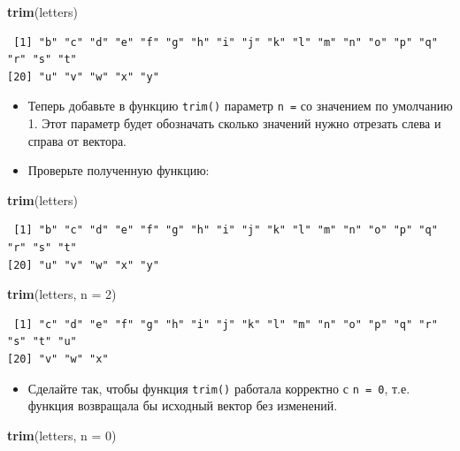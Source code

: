 \documentclass[
]{book}
\newenvironment{Shaded}{\begin{snugshade}}{\end{snugshade}}
\newcommand{\DataTypeTok}[1]{\textcolor[rgb]{0.13,0.29,0.53}{#1}}
\newcommand{\DecValTok}[1]{\textcolor[rgb]{0.00,0.00,0.81}{#1}}
\newcommand{\KeywordTok}[1]{\textcolor[rgb]{0.13,0.29,0.53}{\textbf{#1}}}
\newcommand{\NormalTok}[1]{#1}
\providecommand{\tightlist}{%
  \setlength{\itemsep}{0pt}\setlength{\parskip}{0pt}}
\begin{document}
\begin{Shaded}
\begin{Highlighting}[]
\KeywordTok{trim}\NormalTok{(letters)}
\end{Highlighting}
\end{Shaded}

\begin{verbatim}
 [1] "b" "c" "d" "e" "f" "g" "h" "i" "j" "k" "l" "m" "n" "o" "p" "q" "r" "s" "t"
[20] "u" "v" "w" "x" "y"
\end{verbatim}

\begin{itemize}
\item
  Теперь добавьте в функцию \texttt{trim()} параметр \texttt{n\ =} со значением по умолчанию 1. Этот параметр будет обозначать сколько значений нужно отрезать слева и справа от вектора.
\item
  Проверьте полученную функцию:
\end{itemize}

\begin{Shaded}
\begin{Highlighting}[]
\KeywordTok{trim}\NormalTok{(letters)}
\end{Highlighting}
\end{Shaded}

\begin{verbatim}
 [1] "b" "c" "d" "e" "f" "g" "h" "i" "j" "k" "l" "m" "n" "o" "p" "q" "r" "s" "t"
[20] "u" "v" "w" "x" "y"
\end{verbatim}

\begin{Shaded}
\begin{Highlighting}[]
\KeywordTok{trim}\NormalTok{(letters, }\DataTypeTok{n =} \DecValTok{2}\NormalTok{)}
\end{Highlighting}
\end{Shaded}

\begin{verbatim}
 [1] "c" "d" "e" "f" "g" "h" "i" "j" "k" "l" "m" "n" "o" "p" "q" "r" "s" "t" "u"
[20] "v" "w" "x"
\end{verbatim}

\begin{itemize}
\tightlist
\item
  Сделайте так, чтобы функция \texttt{trim()} работала корректно с \texttt{n\ =\ 0}, т.е. функция возвращала бы исходный вектор без изменений.
\end{itemize}

\begin{Shaded}
\begin{Highlighting}[]
\KeywordTok{trim}\NormalTok{(letters, }\DataTypeTok{n =} \DecValTok{0}\NormalTok{)}
\end{Highlighting}
\end{Shaded}
\end{document}
